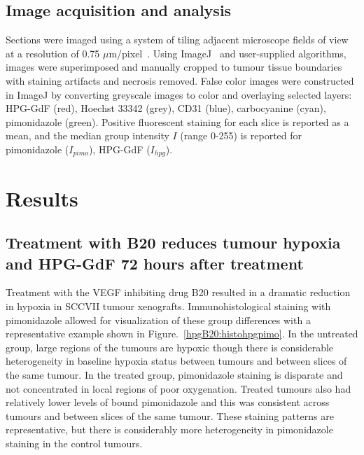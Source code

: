 \subsection{Image acquisition and analysis}
Sections were imaged using a system of tiling adjacent microscope fields of view at a resolution of 0.75 $\mu$m/pixel~\cite{Kyle:2007ch}.
Using ImageJ~\cite{Collins:2007jr} and user-supplied algorithms, images were superimposed and manually cropped to tumour tissue boundaries with staining artifacts and necrosis removed.
False color images were constructed in ImageJ by converting greyscale images to color and overlaying selected layers: \acs{HPG-GdF} (red), Hoechst 33342 (grey), CD31 (blue), carbocyanine (cyan), pimonidazole (green).
Positive fluorescent staining for each slice is reported as a mean, and the median group intensity $I$ (range 0-255) is reported for pimonidazole ($I_{pimo}$), \acs{HPG-GdF} ($I_{hpg}$).

\section{Results}

\subsection{Treatment with B20 reduces tumour hypoxia and \acs{HPG-GdF} 72 hours after treatment}

Treatment with the \acs{VEGF} inhibiting drug B20 resulted in a dramatic reduction in hypoxia in SCCVII tumour xenografts.
Immunohistological staining with pimonidazole allowed for visualization of these group differences with a representative example shown in Figure.~\ref{hpgB20:histohpgpimo}.
In the untreated group, large regions of the tumours are hypoxic though there is considerable heterogeneity in baseline hypoxia status between tumours and between slices of the same tumour.
In the treated group, pimonidazole staining is disparate and not concentrated in local regions of poor oxygenation.
Treated tumours also had relatively lower levels of bound pimonidazole and this was consistent across tumours and between slices of the same tumour.
These staining patterns are representative, but there is considerably more heterogeneity in pimonidazole staining in the control tumours.

